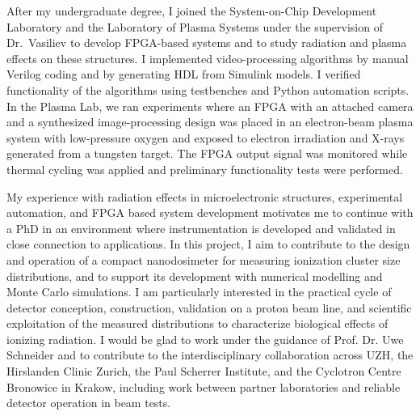 \documentclass[a4paper,11pt]{article}
\begin{document}
\vspace{10pt}
After my undergraduate degree, I joined the System-on-Chip Development Laboratory and the Laboratory of Plasma Systems under the supervision of Dr.\ Vasiliev to develop FPGA-based systems and to study radiation and plasma effects on these structures. I implemented video-processing algorithms by manual Verilog coding and by generating HDL from Simulink models. I verified functionality of the algorithms using testbenches and Python automation scripts. In the Plasma Lab, we ran experiments where an FPGA with an attached camera and a synthesized image-processing design was placed in an electron-beam plasma system with low-pressure oxygen and exposed to electron irradiation and X-rays generated from a tungsten target. The FPGA output signal was monitored while thermal cycling was applied and preliminary functionality tests were performed. 

\vspace{10pt}
My experience with radiation effects in microelectronic structures, experimental automation, and FPGA based system development motivates me to continue with a PhD in an environment where instrumentation is developed and validated in close connection to applications. In this project, I aim to contribute to the design and operation of a compact nanodosimeter for measuring ionization cluster size distributions, and to support its development with numerical modelling and Monte Carlo simulations. I am particularly interested in the practical cycle of detector conception, construction, validation on a proton beam line, and scientific exploitation of the measured distributions to characterize biological effects of ionizing radiation. I would be glad to work under the guidance of Prof. Dr. Uwe Schneider and to contribute to the interdisciplinary collaboration across UZH, the Hirslanden Clinic Zurich, the Paul Scherrer Institute, and the Cyclotron Centre Bronowice in Krakow, including work between partner laboratories and reliable detector operation in beam tests.
\end{document}
